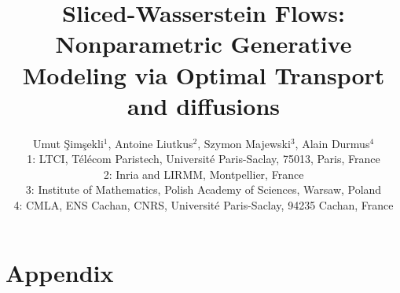 \documentclass[11pt]{article}
\begin{document}
\title{Sliced-Wasserstein Flows: Nonparametric Generative Modeling via Optimal Transport and diffusions}
\author{Umut \c{S}im\c{s}ekli$^{\text{1}}$, Antoine Liutkus$^{\text{2}}$, Szymon Majewski$^{\text{3}}$, Alain Durmus$^{\text{4}}$  \vspace{3pt} \\
{\small 1: LTCI, T\'{e}l\'{e}com Paristech, Universit\'{e} Paris-Saclay, 75013, Paris, France }\\
{\small 2: Inria and LIRMM, Montpellier, France}\\
{\small 3: Institute of Mathematics, Polish Academy of Sciences, Warsaw, Poland}\\
{\small 4: CMLA, ENS Cachan, CNRS, Université Paris-Saclay, 94235 Cachan, France }}
\date{}

\maketitle





\tableofcontents





















\section*{Appendix}




\end{document}
